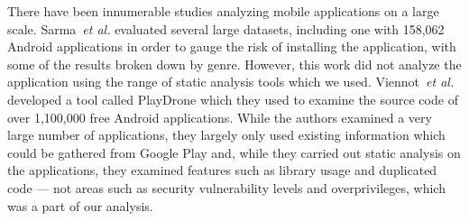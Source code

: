

There have been innumerable studies analyzing mobile applications on a large scale. Sarma~\emph{et al.} evaluated several large datasets, including one with 158,062 Android applications in order to gauge the risk of installing the application, with some of the results broken down by genre. However, this work did not analyze the application using the range of static analysis tools which we used. Viennot~\emph{et al.} developed a tool called PlayDrone which they used to examine the source code of over 1,100,000 free Android applications. While the authors examined a very large number of applications, they largely only used existing information which could be gathered from Google Play and, while they carried out static analysis on the applications, they examined features such as library usage and duplicated code --- not areas such as security vulnerability levels and overprivileges, which was a part of our analysis.




